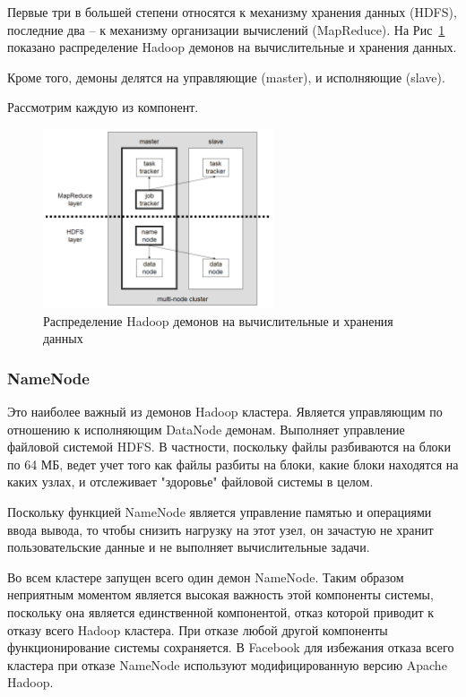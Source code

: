 \documentclass[a4paper,11pt]{article}
\begin{document}
Первые три в большей степени относятся к механизму хранения данных (HDFS), последние два -- к механизму организации
вычислений (MapReduce). На Рис~\ref{fig:daemons_2layers} показано распределение Hadoop демонов на вычислительные и
хранения данных.

Кроме того, демоны делятся на управляющие (master), и исполняющие (slave).

Рассмотрим каждую из компонент.

\begin{figure}[h!]
  \centering
  \includegraphics[height=200px]{res/daemons_2layers.png}
  \caption{Распределение Hadoop демонов на вычислительные и хранения данных}
  \label{fig:daemons_2layers}
\end{figure}


\subsubsection{NameNode}
Это наиболее важный из демонов Hadoop кластера. Является управляющим по отношению к исполняющим DataNode демонам.
Выполняет управление файловой системой HDFS. В частности, поскольку файлы разбиваются на блоки по 64 МБ, ведет учет
того как файлы разбиты на блоки, какие блоки находятся на каких узлах, и отслеживает "здоровье" файловой системы
в целом.

Поскольку функцией NameNode является управление памятью и операциями ввода вывода, то чтобы снизить нагрузку на этот
узел, он зачастую не хранит пользовательские данные и не выполняет вычислительные задачи.

Во всем кластере запущен всего один демон NameNode. Таким образом неприятным моментом является высокая важность
этой компоненты системы, поскольку она является единственной компонентой, отказ которой приводит к отказу всего
Hadoop кластера. При отказе любой другой компоненты функционирование системы сохраняется. В Facebook для избежания
отказа всего кластера при отказе NameNode используют модифицированную версию Apache Hadoop\cite{fb}.
\end{document}
